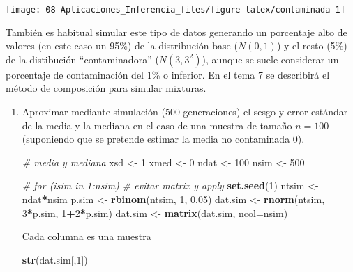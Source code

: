 \documentclass[
]{book}
\newenvironment{Shaded}{\begin{snugshade}}{\end{snugshade}}
\newcommand{\CommentTok}[1]{\textcolor[rgb]{0.56,0.35,0.01}{\textit{#1}}}
\newcommand{\DataTypeTok}[1]{\textcolor[rgb]{0.13,0.29,0.53}{#1}}
\newcommand{\DecValTok}[1]{\textcolor[rgb]{0.00,0.00,0.81}{#1}}
\newcommand{\FloatTok}[1]{\textcolor[rgb]{0.00,0.00,0.81}{#1}}
\newcommand{\KeywordTok}[1]{\textcolor[rgb]{0.13,0.29,0.53}{\textbf{#1}}}
\newcommand{\NormalTok}[1]{#1}
\newcommand{\OperatorTok}[1]{\textcolor[rgb]{0.81,0.36,0.00}{\textbf{#1}}}
\newcommand{\StringTok}[1]{\textcolor[rgb]{0.31,0.60,0.02}{#1}}
\theoremstyle{break}
\theoremstyle{definition}
\theoremstyle{definition}
\theoremstyle{definition}
\theoremstyle{remark}
\let\BeginKnitrBlock\begin \let\EndKnitrBlock\end
\begin{document}
\begin{center}\texttt{[image: 08-Aplicaciones\_Inferencia\_files/figure-latex/contaminada-1]} \end{center}

\BeginKnitrBlock{remark}
\iffalse{} {Nota: } \fi{}También es habitual simular este tipo de datos generando un porcentaje alto de valores (en este caso un 95\%) de la distribución base (\(N(0,1)\)) y el resto (5\%) de la distibución ``contaminadora'' (\(N(3,3^2)\)), aunque se suele considerar un porcentaje de contaminación del 1\% o inferior. En el tema 7 se describirá el método de composición para simular mixturas.
\EndKnitrBlock{remark}

\vspace{0.5cm}

\begin{enumerate}
\def\labelenumi{\alph{enumi})}
\item
  Aproximar mediante simulación (500 generaciones) el sesgo y
  error estándar de la media y la mediana en el caso de una
  muestra de tamaño \(n=100\) (suponiendo que se pretende estimar la
  media no contaminada 0).

\begin{Shaded}
\begin{Highlighting}[]
\CommentTok{# media y mediana}
\NormalTok{xsd <-}\StringTok{ }\DecValTok{1}
\NormalTok{xmed <-}\StringTok{ }\DecValTok{0}
\NormalTok{ndat <-}\StringTok{ }\DecValTok{100}
\NormalTok{nsim <-}\StringTok{ }\DecValTok{500}

\CommentTok{# for (isim in 1:nsim) # evitar matrix y apply}
\KeywordTok{set.seed}\NormalTok{(}\DecValTok{1}\NormalTok{)}
\NormalTok{ntsim <-}\StringTok{ }\NormalTok{ndat}\OperatorTok{*}\NormalTok{nsim}
\NormalTok{p.sim <-}\StringTok{ }\KeywordTok{rbinom}\NormalTok{(ntsim, }\DecValTok{1}\NormalTok{, }\FloatTok{0.05}\NormalTok{)}
\NormalTok{dat.sim <-}\StringTok{ }\KeywordTok{rnorm}\NormalTok{(ntsim, }\DecValTok{3}\OperatorTok{*}\NormalTok{p.sim, }\DecValTok{1}\OperatorTok{+}\DecValTok{2}\OperatorTok{*}\NormalTok{p.sim)}
\NormalTok{dat.sim <-}\StringTok{ }\KeywordTok{matrix}\NormalTok{(dat.sim, }\DataTypeTok{ncol=}\NormalTok{nsim)}
\end{Highlighting}
\end{Shaded}

  Cada columna es una muestra

\begin{Shaded}
\begin{Highlighting}[]
\KeywordTok{str}\NormalTok{(dat.sim[,}\DecValTok{1}\NormalTok{])}
\end{Highlighting}
\end{Shaded}


\end{enumerate}
\end{document}
